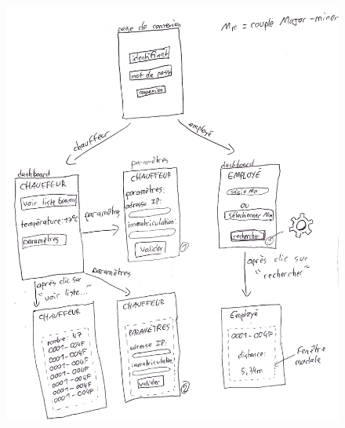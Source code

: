 \documentclass[10pt,a4paper]{article}
\begin{document}
\begin{figure}[h!]
    \centering
    \includegraphics[scale=0.2]{Images/idee_design_application1.png}
    \caption{}
    \label{idee_design_application1}
\end{figure}
\end{document}
